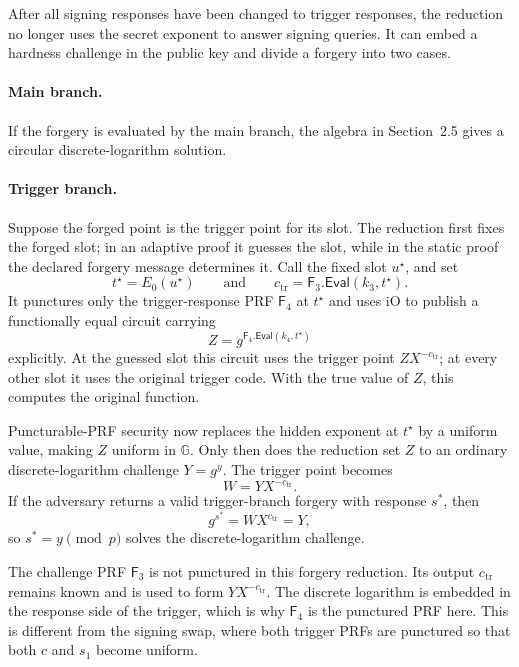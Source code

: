 \documentclass[11pt]{article}
\newcommand{\Eval}{\mathsf{Eval}}
\begin{document}
After all signing responses have been changed to trigger responses, the
reduction no longer uses the secret exponent to answer signing queries.  It
can embed a hardness challenge in the public key and divide a forgery into
two cases.

\paragraph{Main branch.}
If the forgery is evaluated by the main branch, the algebra in Section~2.5
gives a circular discrete-logarithm solution.

\paragraph{Trigger branch.}
Suppose the forged point is the trigger point for its slot.  The reduction
first fixes the forged slot; in an adaptive proof it guesses the slot, while
in the static proof the declared forgery message determines it.  Call the
fixed slot \(u^\star\), and set
\[
  t^\star=E_0(u^\star)
  \qquad\text{and}\qquad
  c_{\mathrm{tr}}=\mathsf{F}_3.\Eval(k_3,t^\star).
\]
It punctures only the trigger-response PRF \(\mathsf{F}_4\) at \(t^\star\)
and uses iO to publish a functionally equal circuit carrying
\[
  Z=g^{\mathsf{F}_4.\Eval(k_4,t^\star)}
\]
explicitly.  At the guessed slot this circuit uses the trigger point
\(ZX^{-c_{\mathrm{tr}}}\); at every other slot it uses the original trigger
code.  With the true value of \(Z\), this computes the original function.

Puncturable-PRF security now replaces the hidden exponent at \(t^\star\) by
a uniform value, making \(Z\) uniform in \(\mathbb{G}\).  Only then does the
reduction set \(Z\) to an ordinary discrete-logarithm challenge \(Y=g^y\).
The trigger point becomes
\[
  W=Y X^{-c_{\mathrm{tr}}}.
\]
If the adversary returns a valid trigger-branch forgery with response \(s^*\),
then
\[
  g^{s^*}=W X^{c_{\mathrm{tr}}}=Y,
\]
so \(s^*=y\pmod p\) solves the discrete-logarithm challenge.

The challenge PRF \(\mathsf{F}_3\) is not punctured in this forgery
reduction.  Its output \(c_{\mathrm{tr}}\) remains known and is used to form
\(YX^{-c_{\mathrm{tr}}}\).  The discrete logarithm is embedded in the
response side of the trigger, which is why \(\mathsf{F}_4\) is the punctured
PRF here.  This is different from the signing swap, where both trigger PRFs
are punctured so that both \(c\) and \(s_1\) become uniform.
\end{document}
